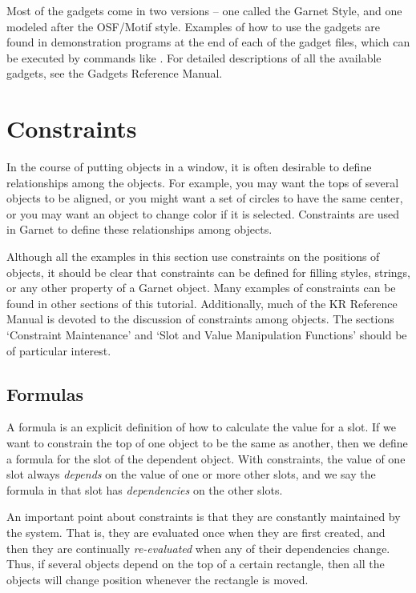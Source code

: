 Most of the gadgets come in two versions -- one called the Garnet
Style, and one modeled after the OSF/Motif style.  Examples of how to
use the gadgets are found in demonstration programs at the end of each
of the gadget files, which can be executed by commands like
.  For detailed descriptions of all the
available gadgets, see the Gadgets Reference Manual.



\chapter{Constraints}
\label{constraints}

In the course of putting objects in a window, it is often desirable to
define relationships among the objects.  For example, you may want
the tops of several objects to be aligned, or you might want a set of
circles to have the same center, or you may want an object to change
color if it is selected.  Constraints are used in Garnet to define
these relationships among objects.

Although all the examples in this section use constraints on the
positions of objects, it should be clear that constraints can be
defined for filling styles, strings, or any other property of a Garnet
object.  Many examples of constraints can be found in other sections
of this tutorial.  Additionally, much of the KR Reference Manual is
devoted to the discussion of constraints among objects.  The sections
`Constraint Maintenance' and `Slot and Value Manipulation Functions'
should be of particular interest.


\section{Formulas}

A formula is an explicit definition of how to calculate the value for
a slot.  If we want to constrain the top of one object to be the same
as another, then we define a formula for the  slot of the dependent
object.  With constraints, the value of one slot always {\it depends} on
the value of one or more other slots, and we say the formula in that
slot has {\it dependencies} on the other slots.

An important point about constraints is that they are constantly
maintained by the system.  That is, they are evaluated once when they
are first created, and then they are continually {\it re-evaluated} when
any of their dependencies change.  Thus, if several objects depend on
the top of a certain rectangle, then all the objects will change
position whenever the rectangle is moved.

